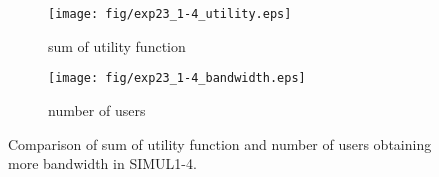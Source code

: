 	
	\begin{figure}
		\begin{center}
			\begin{subfigure}[b]{0.8\textwidth}
				\centering
				\texttt{[image: fig/exp23\_1-4\_utility.eps]}
				\caption{sum of utility function}
				\label{figure:simul1_4_u_a}
			\end{subfigure}
			\begin{subfigure}[b]{0.8\textwidth}
				\centering
				\texttt{[image: fig/exp23\_1-4\_bandwidth.eps]}
				\caption{number of users}
				\label{figure:simul1_4_u_b}
			\end{subfigure}
			\caption{Comparison of sum of utility function and number of users obtaining more bandwidth in SIMUL1-4.}
			\label{figure:simul1_4_u}
		\end{center}
	\end{figure}

